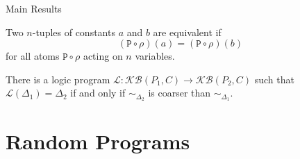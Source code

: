 \documentclass{beamer}
\begin{document}
\begin{frame}{Main Results}
  \begin{definition}[Equivalence]
    Two $n$-tuples of constants $a$ and $b$ are \alert{equivalent} if
    \[
      (\mathtt{P} \circ \rho)(a) = (\mathtt{P} \circ \rho)(b)
    \]
    for all atoms $\mathtt{P} \circ \rho$ acting on $n$ variables.
  \end{definition}
  \pause
  \begin{theorem}
    There is a logic program $\mathcal{L}\colon \mathcal{KB}(P_1, C) \to
    \mathcal{KB}(P_2, C)$ such that $\mathcal{L}(\Delta_1) = \Delta_2$ if and
    only if ${\sim_{\Delta_2}}$ is coarser than ${\sim_{\Delta_1}}$.
  \end{theorem}
\end{frame}

\section{Random Programs}
\end{document}

